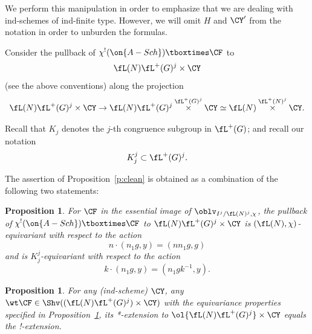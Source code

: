 \documentclass[9pt]{amsart}
\newtheorem{prop}[subsubsection]{Proposition}
\theoremstyle{definition}
\theoremstyle{remark}
\newcommand{\propref}[1]{Proposition~\ref{#1}}
\numberwithin{equation}{section}
\begin{document}
We perform this manipulation in order to emphasize that we are dealing with ind-schemes of
ind-finite type. However, we will omit $H$ and $\CY'$ from the notation in order to unburden the formulas.

\sssec{}

Consider the pullback of $\chi^!(\on{A-Sch})\tboxtimes \CF$ to
$$\fL(N)\fL^+(G)^j\times \CY$$
(see the above conventions)
along the projection
$$\fL(N)\fL^+(G)^j\times \CY\to \fL(N)\fL^+(G)^j \overset{\fL^+(G)^j}\times \CY\simeq
\fL(N) \overset{\fL^+(N)^j}\times \CY.$$

\medskip

Recall that $K_j$ denotes the $j$-th congruence subgroup in $\fL^+(G)$; and recall our notation
$$K_j^j\subset \fL^+(G)^j.$$

The assertion of \propref{p:clean} is obtained as a combination of the following two statements:

\begin{prop} \label{p:K-equiv}
For $\CF$ in the essential image of $\oblv_{I^j/\fL(N)^j,\chi}$, the pullback of $\chi^!(\on{A-Sch})\tboxtimes \CF$ 
to $\fL(N)\fL^+(G)^j\times \CY$ is $(\fL(N),\chi)$-equivariant with respect to the action 
$$n\cdot (n_1g,y)=(nn_1g,g)$$
and is $K^j_j$-equivariant with respect to the action 
$$k\cdot (n_1g,y)=(n_1gk^{-1},y).$$
\end{prop}

\begin{prop} \label{p:pure clean}
For any (ind-scheme) $\CY$, any $\wt\CF\in \Shv((\fL(N)\fL^+(G)^j)\times \CY)$ with the equivariance 
properties specified in \propref{p:K-equiv}, its *-extension to $\ol{\fL(N)\fL^+(G)^j}\times \CY$ equals
the !-extension. 
\end{prop} 
\end{document}
